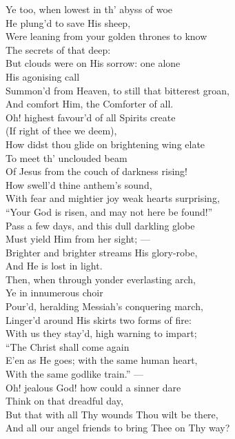   Ye too, when lowest in th’ abyss of woe \\
 He plung’d to save His sheep, \\
 Were leaning from your golden thrones to know \\
 The secrets of that deep: \\
 But clouds were on His sorrow: one alone \\
 His agonising call \\
 Summon’d from Heaven, to still that bitterest groan, \\
 And comfort Him, the Comforter of all. \\
  Oh! highest favour’d of all Spirits create \\
 (If right of thee we deem), \\
 How didst thou glide on brightening wing elate \\
 To meet th’ unclouded beam \\
 Of Jesus from the couch of darkness rising! \\
 How swell’d thine anthem’s sound, \\
 With fear and mightier joy weak hearts surprising, \\
 “Your God is risen, and may not here be found!” \\
  Pass a few days, and this dull darkling globe \\
 Must yield Him from her sight; — \\
 Brighter and brighter streams His glory-robe, \\
 And He is lost in light. \\
 Then, when through yonder everlasting arch, \\
 Ye in innumerous choir \\
 Pour’d, heralding Messiah’s conquering march, \\
 Linger’d around His skirts two forms of fire: \\
  With us they stay’d, high warning to impart; \\
 “The Christ shall come again \\
 E’en as He goes; with the same human heart, \\
 With the same godlike train.” — \\
 Oh! jealous God! how could a sinner dare \\
 Think on that dreadful day, \\
 But that with all Thy wounds Thou wilt be there, \\
 And all our angel friends to bring Thee on Thy way? \\
